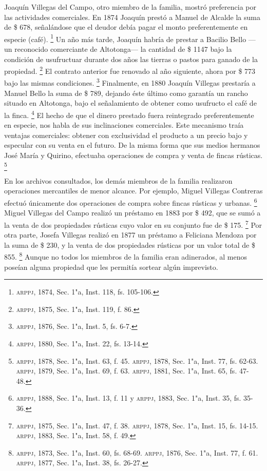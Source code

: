 \documentclass[14pt,twoside,final]{extbook} %
\let\oldfootnote\footnote
\renewcommand\footnote[1]{%
\oldfootnote{\hspace{1mm}#1}}
\begin{document}
Joaquín Villegas del Campo, otro miembro de la familia, mostró preferencia por las actividades comerciales. En 1874 Joaquín prestó a Manuel de Alcalde la suma de \$ 678, señalándose que el deudor debía pagar el monto preferentemente en especie (café).\footnote{\textsc{arppj}, 1874, Sec. 1"a, Inst. 118, fs. 105-106.} Un año más tarde, Joaquín habría de prestar a Bacilio Bello ---un reconocido comerciante de Altotonga--- la cantidad de \$ 1147 bajo la condición de usufructuar durante dos años las tierras o pastos para ganado de la propiedad.\footnote{\textsc{arppj}, 1875, Sec. 1"a, Inst. 119, f. 86.} El contrato anterior fue renovado al año siguiente, ahora por \$ 773 bajo las mismas condiciones.\footnote{\textsc{arppj}, 1876, Sec. 1"a, Inst. 5, fs. 6-7.} Finalmente, en 1880 Joaquín Villegas prestaría a Manuel Bello la suma de \$ 789, dejando éste último como garantía un rancho situado en Altotonga, bajo el señalamiento de obtener como usufructo el café de la finca.\footnote{\textsc{arppj}, 1880, Sec. 1"a, Inst. 22, fs. 13-14.} El hecho de que el dinero prestado fuera reintegrado preferentemente en especie, nos habla de sus inclinaciones comerciales. Este mecanismo traía ventajas comerciales: obtener con exclusividad el producto a un precio bajo y especular con su venta en el futuro. De la misma forma que sus medios hermanos José María y Quirino, efectuaba operaciones de compra y venta de fincas rústicas.\footnote{\textsc{arppj}, 1878, Sec. 1"a, Inst. 63, f. 45. \textsc{arppj}, 1878, Sec. 1"a, Inst. 77, fs. 62-63. \textsc{arppj}, 1879, Sec. 1"a, Inst. 69, f. 63. \textsc{arppj}, 1881, Sec. 1"a, Inst. 65, fs. 47-48.}

En los archivos consultados, los demás miembros de la familia realizaron operaciones mercantiles de menor alcance. Por ejemplo, Miguel Villegas Contreras efectuó únicamente dos operaciones de compra sobre fincas rústicas y urbanas.\footnote{\textsc{arppj}, 1888, Sec. 1"a, Inst. 13, f. 11 y \textsc{arppj}, 1883, Sec. 1"a, Inst. 35, fs. 35-36.} Miguel Villegas del Campo realizó un préstamo en 1883 por \$ 492, que se sumó a la venta de dos propiedades rústicas cuyo valor en su conjunto fue de \$ 175.\footnote{\textsc{arppj}, 1875, Sec. 1"a, Inst. 47, f. 38. \textsc{arppj}, 1878, Sec. 1"a, Inst. 15, fs. 14-15. \textsc{arppj}, 1883, Sec. 1"a, Inst. 58, f. 49.} Por otra parte, Josefa Villegas realizó en 1877 un préstamo a Feliciana Mendoza por la suma de \$ 230, y la venta de dos propiedades rústicas por un valor total de \$ 855.\footnote{\textsc{arppj}, 1873, Sec. 1"a, Inst. 60, fs. 68-69. \textsc{arppj}, 1876, Sec. 1"a, Inst. 77, f. 61. \textsc{arppj}, 1877, Sec. 1"a, Inst. 38, fs. 26-27.} Aunque no todos los miembros de la familia eran adinerados, al menos poseían alguna propiedad que les permitía sortear algún imprevisto.
\end{document}
